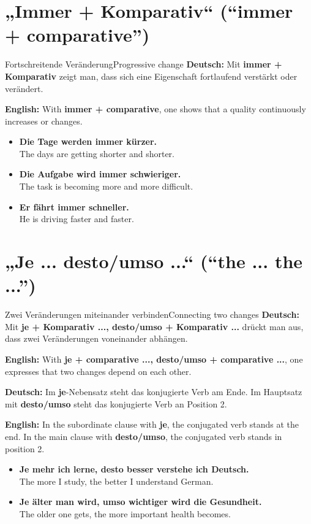 \documentclass[a4paper,11pt]{article}
\newcommand{\GermanText}[1]{\textbf{Deutsch: }#1\par}
\newcommand{\EnglishText}[1]{{\small\color{SoftGray}\textbf{English: }#1\par}}
\newcommand{\ExampleItem}[2]{\item \textbf{#1}\\{\small\color{SoftGray}#2}}
\begin{document}
   \section{„Immer + Komparativ“ \textnormal{(“immer + comparative”)}}

      \begin{grammarentry}{Fortschreitende Veränderung}{Progressive change}
         \GermanText{Mit \textbf{immer + Komparativ} zeigt man, dass sich eine Eigenschaft fortlaufend verstärkt oder verändert.}
         \EnglishText{With \textbf{immer + comparative}, one shows that a quality continuously increases or changes.}
      \end{grammarentry}

      \begin{exbox}
         \begin{itemize}
            \ExampleItem{Die Tage werden immer kürzer.}{The days are getting shorter and shorter.}
            \ExampleItem{Die Aufgabe wird immer schwieriger.}{The task is becoming more and more difficult.}
            \ExampleItem{Er fährt immer schneller.}{He is driving faster and faster.}
         \end{itemize}
      \end{exbox}

   \section{„Je ... desto/umso ...“ \textnormal{(“the ... the ...”)}}

      \begin{grammarentry}{Zwei Veränderungen miteinander verbinden}{Connecting two changes}
         \GermanText{Mit \textbf{je + Komparativ ..., desto/umso + Komparativ ...} drückt man aus, dass zwei Veränderungen voneinander abhängen.}
         \EnglishText{With \textbf{je + comparative ..., desto/umso + comparative ...}, one expresses that two changes depend on each other.}

         \GermanText{Im \textbf{je}-Nebensatz steht das konjugierte Verb am Ende. Im Hauptsatz mit \textbf{desto/umso} steht das konjugierte Verb an Position 2.}
         \EnglishText{In the subordinate clause with \textbf{je}, the conjugated verb stands at the end. In the main clause with \textbf{desto/umso}, the conjugated verb stands in position 2.}
      \end{grammarentry}

      \begin{exbox}
         \begin{itemize}
            \ExampleItem{Je mehr ich lerne, desto besser verstehe ich Deutsch.}{The more I study, the better I understand German.}
            \ExampleItem{Je älter man wird, umso wichtiger wird die Gesundheit.}{The older one gets, the more important health becomes.}
         \end{itemize}
      \end{exbox}
\end{document}
